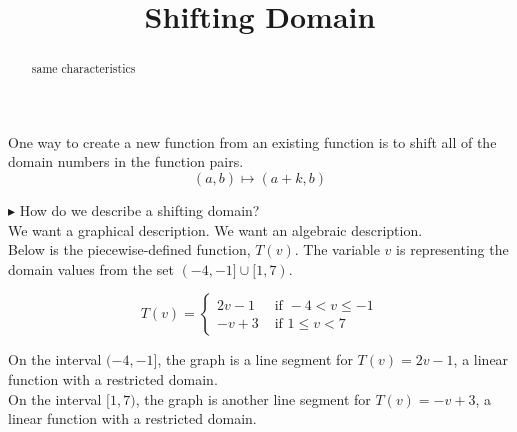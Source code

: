 \documentclass{ximera}
\title{Shifting Domain}
\begin{document}
\begin{abstract}
same characteristics
\end{abstract}
\maketitle








One way to create a new function from an existing function is to shift all of the domain numbers in the function pairs. \\

\[
(a, b) \mapsto (a + k, b)
\]



\textbf{\textcolor{blue!55!black}{$\blacktriangleright$}} How do we describe a shifting domain? \\

We want a graphical description. We want an algebraic description. \\




Below is the piecewise-defined function, $T(v)$.  The variable $v$ is representing the domain values from the set $(-4,-1] \cup [1,7)$.




\[
T(v) = 
\begin{cases}
  2v-1 & \text{ if }  -4 < v \leq -1 \\
  -v+3 & \text{ if } 1 \leq v < 7
\end{cases}
\]


On the interval $(-4, -1]$, the graph is a line segment for $T(v) = 2v-1$, a linear function with a restricted domain. \\



On the interval $[1, 7)$, the graph is another line segment for $T(v) = -v+3$, a linear function with a restricted domain. \\
\end{document}
